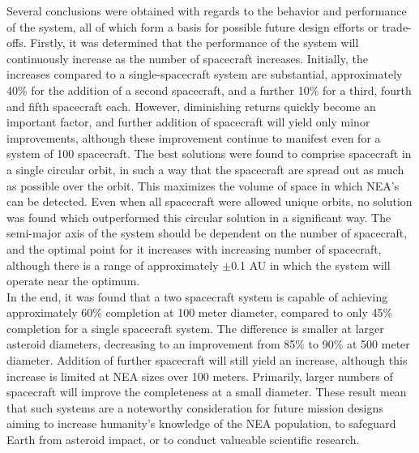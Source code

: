 Several conclusions were obtained with regards to the behavior and performance of the system, all of which form a basis for possible future design efforts or trade-offs. Firstly, it was determined that the performance of the system will continuously increase as the number of spacecraft increases. Initially, the increases compared to a single-spacecraft system are substantial, approximately 40\% for the addition of a second spacecraft, and a further 10\% for a third, fourth and fifth spacecraft each. However, diminishing returns quickly become an important factor, and further addition of spacecraft will yield only minor improvements, although these improvement continue to manifest even for a system of 100 spacecraft. The best solutions were found to comprise spacecraft in a single circular orbit, in such a way that the spacecraft are spread out as much as possible over the orbit. This maximizes the volume of space in which NEA's can be detected. Even when all spacecraft were allowed unique orbits, no solution was found which outperformed this circular solution in a significant way. The semi-major axis of the system should be dependent on the number of spacecraft, and the optimal point for it increases with increasing number of spacecraft, although there is a range of approximately $\pm$0.1 AU in which the system will operate near the optimum. \\

In the end, it was found that a two spacecraft system is capable of achieving approximately 60\% completion at 100 meter diameter, compared to only 45\% completion for a single spacecraft system. The difference is smaller at larger asteroid diameters, decreasing to an improvement from 85\% to 90\% at 500 meter diameter. Addition of further spacecraft will still yield an increase, although this increase is limited at NEA sizes over 100 meters. Primarily, larger numbers of spacecraft will improve the completeness at a small diameter. These result mean that such systems are a noteworthy consideration for future mission designs aiming to increase humanity's knowledge of the NEA population, to safeguard Earth from asteroid impact, or to conduct valueable scientific research.
